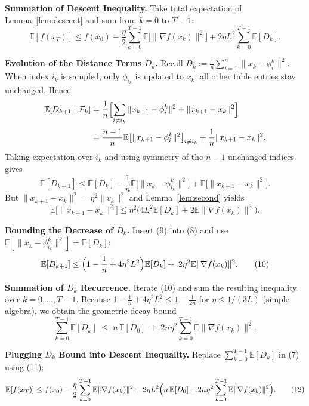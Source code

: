 \documentclass{article}
\newcommand{\E}{\mathbb{E}}
\begin{document}
\begin{enumerate}[label={[\textbf{Step \arabic*}]}]
\item \textbf{Summation of Descent Inequality.}  
Take total expectation of Lemma~\ref{lem:descent} and sum from $k=0$ to $T-1$:
\[
\E[f(x_T)]\le f(x_0)-\frac{\eta}{2}\sum_{k=0}^{T-1}\E\bigl[\|\nabla f(x_k)\|^{2}\bigr]
+2\eta L^{2}\sum_{k=0}^{T-1}\E[D_k].
\tag{7}
\]

\item \textbf{Evolution of the Distance Terms $D_k$.}  
Recall $D_k:=\frac1n\sum_{i=1}^{n}\|x_k-\phi_i^k\|^{2}$.  When index $i_k$ is sampled, only $\phi_{i_k}$ is updated to $x_k$; all other table entries stay unchanged.  Hence
\[
\begin{aligned}
\E[D_{k+1}\mid\mathcal{F}_k]
&=\frac1n\Bigl[\sum_{i\neq i_k}\|x_{k+1}-\phi_i^k\|^{2}+\|x_{k+1}-x_k\|^{2}\Bigr] \\[2pt]
&=\frac{n-1}{n}\E\bigl[\|x_{k+1}-\phi_i^k\|^{2}\bigr]_{i\neq i_k}
+\frac1n\|x_{k+1}-x_k\|^{2}.
\end{aligned}
\]
Taking expectation over $i_k$ and using symmetry of the $n-1$ unchanged indices gives
\[
\E[D_{k+1}]
\le \E[D_k]-\frac{1}{n}\E\bigl[\|x_k-\phi_{i_k}^k\|^{2}\bigr]
+\E\bigl[\|x_{k+1}-x_k\|^{2}\bigr].
\tag{8}
\]
But $\|x_{k+1}-x_k\|^{2}=\eta^{2}\|v_k\|^{2}$ and Lemma~\ref{lem:second} yields
\[
\E\bigl[\|x_{k+1}-x_k\|^{2}\bigr]
\le \eta^{2}\bigl(4L^{2}\E[D_k]+2\E\|\nabla f(x_k)\|^{2}\bigr).
\tag{9}
\]

\item \textbf{Bounding the Decrease of $D_k$.}  
Insert (9) into (8) and use $\E[\|x_k-\phi_{i_k}^k\|^{2}]=\E[D_k]$:
\[
\E[D_{k+1}]
\le \Bigl(1-\frac1n+4\eta^{2}L^{2}\Bigr)\E[D_k]
+\;2\eta^{2}\E\|\nabla f(x_k)\|^{2}.
\tag{10}
\]

\item \textbf{Summation of $D_k$ Recurrence.}  
Iterate (10) and sum the resulting inequality over $k=0,\dots,T-1$.  Because $1-\frac1n+4\eta^{2}L^{2}\le 1-\frac1{2n}$ for $\eta\le 1/(3L)$ (simple algebra), we obtain the geometric decay bound
\[
\sum_{k=0}^{T-1}\E[D_k]\;\le\; n\,\E[D_0]\;+\;2n\eta^{2}\sum_{k=0}^{T-1}\E\|\nabla f(x_k)\|^{2}.
\tag{11}
\]

\item \textbf{Plugging $D_k$ Bound into Descent Inequality.}  
Replace $\sum_{k=0}^{T-1}\E[D_k]$ in (7) using (11):
\[
\E[f(x_T)]\le f(x_0)-\frac{\eta}{2}\sum_{k=0}^{T-1}\E\|\nabla f(x_k)\|^{2}
+2\eta L^{2}\Bigl( n\,\E[D_0]+2n\eta^{2}\sum_{k=0}^{T-1}\E\|\nabla f(x_k)\|^{2}\Bigr).
\tag{12}
\]


\end{enumerate}
\end{document}
